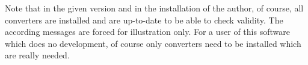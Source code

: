 Note that in the given version and in the installation of the author,
of course, all converters are installed and are up-to-date
to be able to check validity.
The according messages are forced for illustration only. 
For a user of this software which does no development, 
of course only converters need to be installed which are really needed. 


